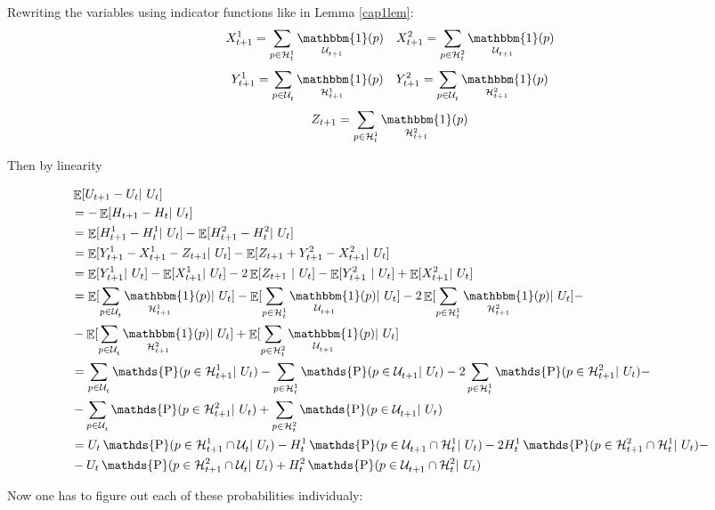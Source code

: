 \documentclass{article}
\DeclareMathOperator{\EX}{\mathbb{E}}%
\DeclareMathOperator{\Pb}{\mathds{P}}
\newcommand{\Up}[2]{\mathcal{U}_{#1}^{#2}}
\newcommand{\Hp}[2]{\mathcal{H}_{#1}^{#2}}
\DeclareMathOperator{\Ind}{\mathbbm{1}}
\begin{document}
Rewriting the variables using indicator functions like in Lemma \ref{cap1lem}:
\[X_{t+1}^1 = \sum_{p \in \Hp{t}{1}} \Ind_{\Up{t+1}{}}(p) \quad X_{t+1}^2 = \sum_{p \in \Hp{t}{2}} \Ind_{\Up{t+1}{}}(p)\]
\[Y_{t+1}^1 = \sum_{p \in \Up{t}{}} \Ind_{\Hp{t+1}{1}}(p) \quad Y_{t+1}^2 = \sum_{p \in \Up{t}{}} \Ind_{\Hp{t+1}{2}}(p)\]
\[Z_{t+1} = \sum_{p \in \Hp{t}{1}} \Ind_{\Hp{t+1}{2}}(p)\]

Then by linearity

\begin{spacing}{1.5}
\begin{align*}{}
  &\EX[U_{t+1} - U_t|\ U_t]\\ 
  &= -\EX[H_{t+1} - H_{t} |\ U_t] \\
  &= \EX[H_{t+1}^1 - H_{t}^1 |\ U_t] - \EX[H_{t+1}^2 - H_{t}^2 |\ U_t]  \\
  &= \EX[Y_{t+1}^1 - X_{t+1}^1 - Z_{t+1} |\ U_t] - \EX[Z_{t+1} + Y_{t+1}^2 - X_{t+1}^2 |\ U_t]  \\
  &= \EX[Y_{t+1}^1 |\ U_t] - \EX[X_{t+1}^1 |\ U_t] - 2 \EX[Z_{t+1}\ |\ U_t] - \EX[Y_{t+1}^2\ |\ U_t] + \EX[X_{t+1}^2 |\ U_t]  \\
  &= \EX[\sum_{p \in \Up{t}{}} \Ind_{\Hp{t+1}{1}}(p) |\ U_t] - \EX[\sum_{p \in \Hp{t}{1}} \Ind_{\Up{t+1}{}}(p) |\ U_t] 
  - 2 \EX[\sum_{p \in \Hp{t}{1}} \Ind_{\Hp{t+1}{2}}(p) |\ U_t] - \\
  &-\EX[\sum_{p \in \Up{t}{}} \Ind_{\Hp{t+1}{2}}(p) |\ U_t] + \EX[\sum_{p \in \Hp{t}{2}} \Ind_{\Up{t+1}{}}(p)|\ U_t]  \\
  &= \sum_{p \in \Up{t}{}} \Pb(p \in \Hp{t+1}{1}|\ U_t) - \sum_{p \in \Hp{t}{1}} \Pb(p \in \Up{t+1}{} |\ U_t) 
  - 2 \sum_{p \in \Hp{t}{1}} \Pb(p \in \Hp{t+1}{2} |\ U_t) - \\
  &-\sum_{p \in \Up{t}{}} \Pb(p \in \Hp{t+1}{2} |\ U_t) + \sum_{p \in \Hp{t}{2}} \Pb(p \in \Up{t+1}{}|\ U_t)  \\
  &= U_t \Pb(p \in \Hp{t+1}{1} \cap \Up{t}{}|\ U_t) - H_t^1 \Pb(p \in \Up{t+1}{} \cap \Hp{t}{1} |\ U_t) 
  - 2 H_t^1 \Pb(p \in \Hp{t+1}{2} \cap \Hp{t}{1}|\ U_t) - \\
  &- U_t \Pb(p \in \Hp{t+1}{2} \cap \Up{t}{} |\ U_t) +  H_t^2 \Pb(p \in \Up{t+1}{} \cap \Hp{t}{2}|\ U_t)  \\
\end{align*}
\end{spacing}
Now one has to figure out each of these probabilities individualy:
\end{document}
